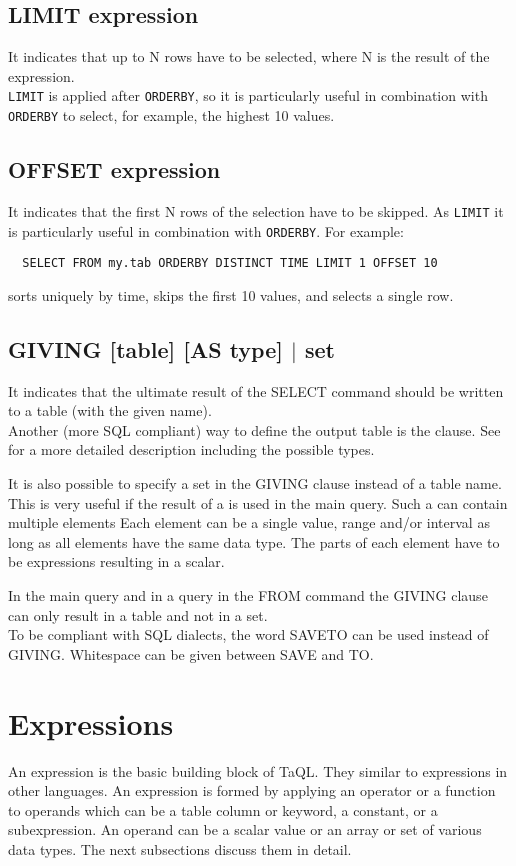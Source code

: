 \subsection{LIMIT expression}
It indicates that up to N rows have to be selected, where N is
the result of the expression. 
\\\texttt{LIMIT} is applied after \texttt{ORDERBY}, so it is
particularly useful in combination with
\texttt{ORDERBY} to select, for example, the highest 10 values.

\subsection{OFFSET expression}
It indicates that the first N rows of the selection have to be 
skipped. As \texttt{LIMIT} it is particularly useful in
combination with \texttt{ORDERBY}. For example:
\begin{verbatim}
  SELECT FROM my.tab ORDERBY DISTINCT TIME LIMIT 1 OFFSET 10
\end{verbatim}
sorts uniquely by time, skips the first 10 values, and selects a
single row.

\subsection{\label{TAQL:GIVING}GIVING [table] [AS type] $|$ set}
It indicates that the ultimate result of the SELECT command should be
written to a table (with the given name).
\\Another (more SQL compliant) way to define the output table
is the  clause. See 
for a more detailed description including the possible types.

It is also possible to specify a set in the GIVING clause
instead of a table name. This is very useful if the result of a
 is used in the main query.
Such a  can contain multiple elements
Each element can be a single value, range and/or interval as
long as all elements have the same data type.
The parts of each element have to be expressions resulting in a scalar.

In the main query and in a query in the FROM command the
GIVING clause can only result in a table and not in a set.
\\To be compliant with SQL dialects, the word SAVETO can be
used instead of GIVING. Whitespace can be given between SAVE and TO.
 

\section{\label{TAQL:EXPRESSIONS}Expressions}
An expression is the basic building block of TaQL. They similar to
expressions in other languages. An expression is formed by
applying an operator or a function to operands which can be
a table column or keyword, a constant, or a subexpression.
An operand can be a scalar value or an array or set of various data types.
The next subsections discuss them in detail.

